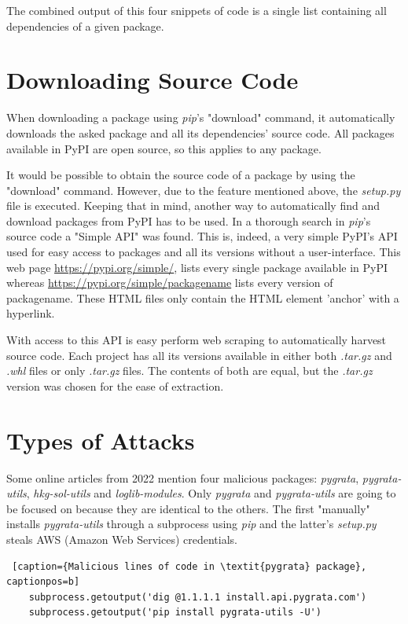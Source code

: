 The combined output of this four snippets of code is a single list containing all dependencies of a given package.

\section{Downloading Source Code}
When downloading a package using \textit{pip}'s "download" command, it automatically downloads the asked package and all its dependencies' source code. All packages available in PyPI are open source, so this applies to any package.

It would be possible to obtain the source code of a package by using the "download" command. However, due to the feature mentioned above, the \textit{setup.py} file is executed. Keeping that in mind, another way to automatically find and download packages from PyPI has to be used. In a thorough search in \textit{pip}'s source code a "Simple API" was found. This is, indeed, a very simple PyPI's API used for easy access to packages and all its versions without a user-interface. This web page \url{https://pypi.org/simple/}, lists every single package available in PyPI whereas \url{https://pypi.org/simple/packagename} lists every version of packagename. These HTML files only contain the HTML element 'anchor' with a hyperlink.

With access to this API is easy perform web scraping to automatically harvest source code. Each project has all its versions available in either both \textit{.tar.gz} and \textit{.whl} files or only \textit{.tar.gz} files. The contents of both are equal, but the \textit{.tar.gz} version was chosen for the ease of extraction.


\section{Types of Attacks}
Some online articles from 2022 mention four malicious packages: \textit{pygrata}, \textit{pygrata-utils}, \textit{hkg-sol-utils} and \textit{loglib-modules}. Only \textit{pygrata} and \textit{pygrata-utils} are going to be focused on because they are identical to the others. The first "manually" installs \textit{pygrata-utils} through a subprocess using \textit{pip} and the latter's \textit{setup.py} steals AWS (Amazon Web Services) credentials.

\begin{lstlisting} [caption={Malicious lines of code in \textit{pygrata} package}, captionpos=b]
    subprocess.getoutput('dig @1.1.1.1 install.api.pygrata.com')
    subprocess.getoutput('pip install pygrata-utils -U')
\end{lstlisting}

